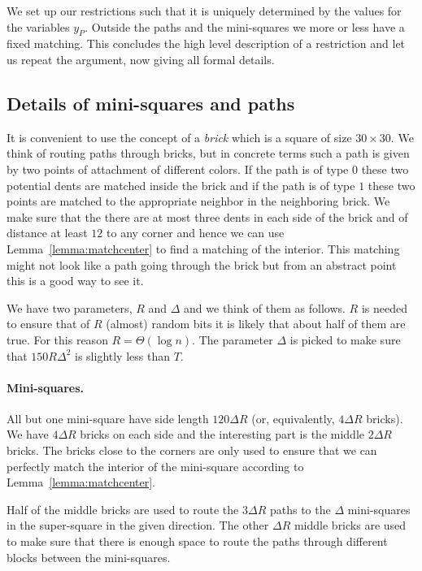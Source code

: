 \documentclass{theoretics}
\begin{document}
We set up our restrictions such that it is uniquely
determined by the values for the variables $y_P$.
Outside the paths and
the mini-squares we more or less have a fixed matching.
This concludes the high level description of
a restriction and let us repeat the argument, now giving all
formal details.

\subsection{Details of mini-squares and paths}

It is convenient to
use the concept of a {\em brick} which is a square of size
$30 \times 30$.  We think of routing paths
through bricks, but in concrete terms such a path
is given by two points of attachment of different colors.
If the path is of type $0$ these two potential dents
are matched inside the brick and if the path is of type
$1$ these two points are matched to the appropriate neighbor
in the neighboring brick.   We make sure that the 
there are at most three dents in each side of the brick and
of distance at least $12$ to any corner and hence we can
use Lemma~\ref{lemma:matchcenter} to find a matching
of the interior.  This matching might not look like
a path going through the brick but from an abstract point
this is a good way to see it.

We have two parameters, $R$ and $\Delta$ and we
think of them as follows.  $R$ is needed to ensure
that of $R$ (almost) random bits it is likely that
about half of them are true.  For this reason $R=\Theta (\log n)$.
The parameter $\Delta$ is picked to make sure that 
$150 R \Delta^2$ is slightly less than $T$.

\paragraph{Mini-squares.} All but one mini-square have side length $120 \Delta R$
(or, equivalently, $4 \Delta R$ bricks).
We have $4\Delta R$ bricks on each side and 
the interesting part is the middle $2\Delta R$ bricks.
The bricks close to the corners are only used to 
ensure that we can perfectly match the interior of the
mini-square according to Lemma~\ref{lemma:matchcenter}.

Half of the middle bricks are used to route the $3\Delta R$ paths
to the $\Delta$ mini-squares in the super-square in the
given direction.  The other $\Delta R$ middle bricks
are used to make sure that there is enough space to
route the paths through different blocks between
the mini-squares.  
\end{document}
